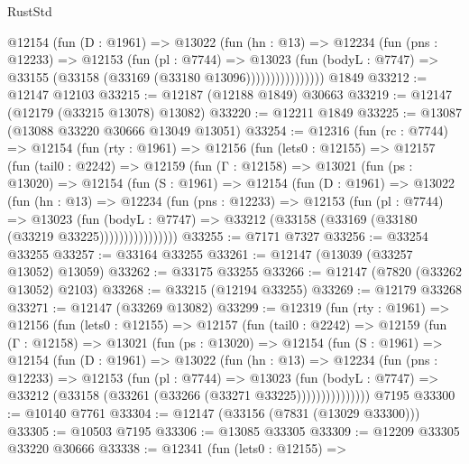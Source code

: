 \begin{lexlean}{RustStd}
\begin{coremodule}
                  @12154
                    (fun (D : @1961) =>
                    @13022
                      (fun (hn : @13) =>
                      @12234
                        (fun (pns : @12233) =>
                        @12153
                          (fun (pl : @7744) =>
                          @13023
                            (fun (bodyL : @7747) =>
                            @33155 (@33158 (@33169 (@33180 @13096))))))))))))))))
    @1849
@33212 := @12147 @12103
@33215 := @12187 (@12188 @1849) @30663
@33219 := @12147 (@12179 (@33215 @13078) @13082)
@33220 := @12211 @1849
@33225 := @13087 (@13088 @33220 @30666 @13049 @13051)
@33254 := @12316
    (fun (rc : @7744) =>
    @12154
      (fun (rty : @1961) =>
      @12156
        (fun (lets0 : @12155) =>
        @12157
          (fun (tail0 : @2242) =>
          @12159
            (fun (Γ : @12158) =>
            @13021
              (fun (ps : @13020) =>
              @12154
                (fun (S : @1961) =>
                @12154
                  (fun (D : @1961) =>
                  @13022
                    (fun (hn : @13) =>
                    @12234
                      (fun (pns : @12233) =>
                      @12153
                        (fun (pl : @7744) =>
                        @13023
                          (fun (bodyL : @7747) =>
                          @33212 (@33158 (@33169 (@33180 (@33219 @33225))))))))))))))))
@33255 := @7171 @7327
@33256 := @33254 @33255
@33257 := @33164 @33255
@33261 := @12147 (@13039 (@33257 @13052) @13059)
@33262 := @33175 @33255
@33266 := @12147 (@7820 (@33262 @13052) @2103)
@33268 := @33215 (@12194 @33255)
@33269 := @12179 @33268
@33271 := @12147 (@33269 @13082)
@33299 := @12319
    (fun (rty : @1961) =>
    @12156
      (fun (lets0 : @12155) =>
      @12157
        (fun (tail0 : @2242) =>
        @12159
          (fun (Γ : @12158) =>
          @13021
            (fun (ps : @13020) =>
            @12154
              (fun (S : @1961) =>
              @12154
                (fun (D : @1961) =>
                @13022
                  (fun (hn : @13) =>
                  @12234
                    (fun (pns : @12233) =>
                    @12153
                      (fun (pl : @7744) =>
                      @13023
                        (fun (bodyL : @7747) =>
                        @33212 (@33158 (@33261 (@33266 (@33271 @33225)))))))))))))))
    @7195
@33300 := @10140 @7761
@33304 := @12147 (@33156 (@7831 (@13029 @33300)))
@33305 := @10503 @7195
@33306 := @13085 @33305
@33309 := @12209 @33305 @33220 @30666
@33338 := @12341
    (fun (lets0 : @12155) =>

\end{coremodule}
\end{lexlean}
